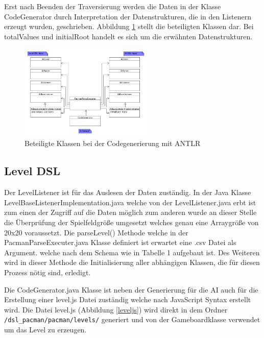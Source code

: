 \documentclass[conference]{IEEEtran}
\begin{document}
Erst nach Beenden der Traversierung werden die Daten in der Klasse CodeGenerator durch Interpretation der Datenstrukturen, die in den Listenern erzeugt wurden, geschrieben. Abbildung \ref{antlr_classes} stellt die beteiligten Klassen dar. Bei totalValues und initialRoot handelt es sich um die erwähnten Datenstrukturen.

\begin{figure}[!htb]
\centering
\includegraphics[width=2.5in]{code_gen_rough.png}

\caption{Beteiligte Klassen bei der Codegenerierung mit ANTLR}
\label{antlr_classes}
\end{figure}

\subsection{Level DSL}
Der LevelListener ist für das Auslesen der Daten zuständig. In der Java Klasse LevelBaseListenerImplementation.java welche von der LevelListener.java erbt ist zum einen der Zugriff auf die Daten möglich zum anderen wurde an dieser Stelle die Überprüfung der Spielfeldgröße umgesetzt welches genau eine Arraygröße von 20x20 voraussetzt. Die parseLevel() Methode welche in der PacmanParseExecuter.java Klasse definiert ist erwartet eine .csv Datei als Argument. welche nach dem Schema wie in Tabelle 1 aufgebaut ist. Des Weiteren wird in dieser Methode die Initialisierung aller abhängigen Klassen, die für diesen Prozess nötig sind, erledigt.

Die CodeGenerator.java Klasse ist neben der Generierung für die AI auch für die Erstellung einer level.js Datei zuständig welche nach JavaScript Syntax erstellt wird. Die Datei level.js (Abbildung \ref{leveljs})
wird direkt in dem Ordner \texttt{/dsl\_pacman/pacman/levels/} generiert und von der Gameboardklasse verwendet um das Level zu erzeugen.
\end{document}
